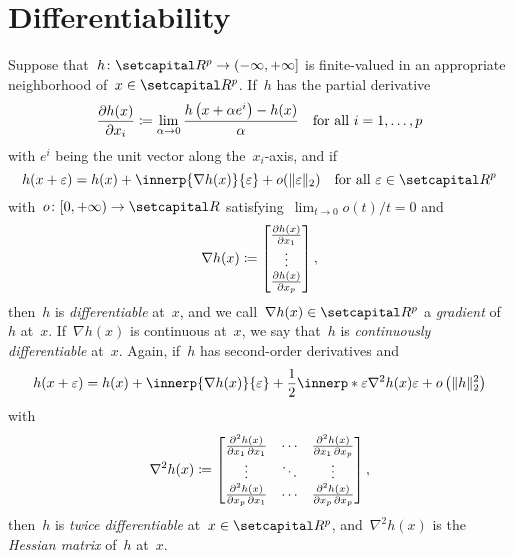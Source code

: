 \documentclass[../main]{subfiles}
\begin{document}
\section{Differentiability}
Suppose that~$h \colon \setR^p \to (-\infty, +\infty]$ is finite-valued in an appropriate neighborhood of~$x \in \setR^p$.
If~$h$ has the partial derivative
\begin{equation} \label{eq:pdv}
    \pdv{h(x)}{x_i} \coloneqq \lim_{\alpha \to 0} \frac{h\left(x + \alpha e^i\right) - h(x)}{\alpha} \quad \text{for all~$i = 1, \dots, p$}
\end{equation} 
with $e^i$ being the unit vector along the~$x_i$-axis, and if
\begin{equation} \label{eq:first_order_approximation}
    h(x + \varepsilon) = h(x) + \innerp{\nabla h(x)}{\varepsilon} + o(\norm{\varepsilon}_2) \forallcondition{\varepsilon \in \setR^p}
\end{equation} 
with~$o \colon [0, +\infty) \to \setR$ satisfying~$\lim_{t \to 0} o(t) / t = 0$ and
\begin{equation} \label{eq:grad}
    \nabla h(x) \coloneqq 
    \begin{bmatrix} 
        \pdv{h(x)}{x_1} \\ \vdots \\ \pdv{h(x)}{x_p} 
    \end{bmatrix}
,\end{equation} 
then~$h$ is \emph{differentiable} at~$x$, and we call~$\nabla h(x) \in \setR^p$ a \emph{gradient} of~$h$ at~$x$.
If~$\nabla h(x)$ is continuous at~$x$, we say that~$h$ is \emph{continuously differentiable} at~$x$.
Again, if~$h$ has second-order derivatives and
\begin{equation}
    h(x + \varepsilon) = h(x) + \innerp{\nabla h(x)}{\varepsilon} + \frac{1}{2} \innerp*{\varepsilon}{\nabla^2 h(x) \varepsilon} + o\left(\norm{h}_2^2\right)
\end{equation} 
with
\begin{equation} \label{eq:hess}
    \nabla^2 h(x) \coloneqq
    \begin{bmatrix} 
        \pdv{h(x)}{x_1,x_1} & \cdots & \pdv{h(x)}{x_1,x_p} \\
        \vdots & \ddots & \vdots \\
        \pdv{h(x)}{x_p,x_1} & \cdots & \pdv{h(x)}{x_p,x_p} \\
    \end{bmatrix} 
,\end{equation} 
then~$h$ is \emph{twice differentiable} at~$x \in \setR^p$, and~$\nabla^2 h(x)$ is the \emph{Hessian matrix} of~$h$ at~$x$.
\end{document}
